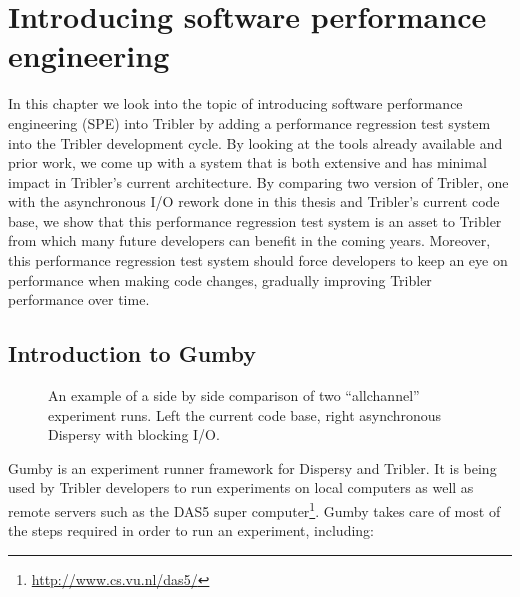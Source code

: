 \chapter{Introducing software performance engineering}

In this chapter we look into the topic of introducing software performance engineering (SPE) into Tribler by adding a performance regression test system into the Tribler development cycle.
By looking at the tools already available and prior work, we come up with a system that is both extensive and has minimal impact in Tribler's current architecture.
By comparing two version of Tribler, one with the asynchronous I/O rework done in this thesis and Tribler's current code base, we show that this performance regression test system is an asset to Tribler from which many future developers can benefit in the coming years.
Moreover, this performance regression test system should force developers to keep an eye on performance when making code changes, gradually improving Tribler performance over time.

\section{Introduction to Gumby}
\begin{figure}[h]
	\caption{An example of a side by side comparison of two \enquote{allchannel} experiment runs. Left the current code base, right asynchronous Dispersy with blocking I/O.}
	\label{fig:side_by_side_send}
\end{figure} 

Gumby is an experiment runner framework for Dispersy and Tribler.
It is being used by Tribler developers to run experiments on local computers as well as remote servers such as the DAS5 super computer\footnote{\url{http://www.cs.vu.nl/das5/}}.
Gumby takes care of most of the steps required in order to run an experiment, including:

